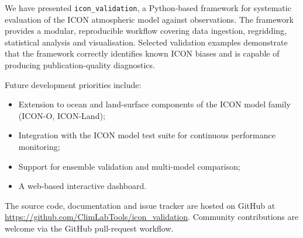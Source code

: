 \documentclass[gmd, manuscript]{copernicus}
\begin{document}
\conclusions

We have presented \texttt{icon\_validation}, a Python-based framework for
systematic evaluation of the ICON atmospheric model against observations.
The framework provides a modular, reproducible workflow covering data
ingestion, regridding, statistical analysis and visualisation.
Selected validation examples demonstrate that the framework correctly
identifies known ICON biases and is capable of producing publication-quality
diagnostics.

Future development priorities include:
\begin{itemize}
  \item Extension to ocean and land-surface components of the ICON model
        family (ICON-O, ICON-Land);
  \item Integration with the ICON model test suite for continuous
        performance monitoring;
  \item Support for ensemble validation and multi-model comparison;
  \item A web-based interactive dashboard.
\end{itemize}

The source code, documentation and issue tracker are hosted on GitHub at
\url{https://github.com/ClimLabTools/icon_validation}.
Community contributions are welcome via the GitHub pull-request workflow.


\end{document}
